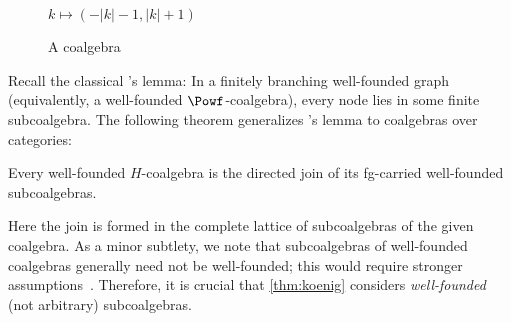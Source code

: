 \begin{figure}
\begin{minipage}[b]{.40\textwidth}
  \label{fig:joinSubcoalgebras}
  \end{minipage}  \begin{minipage}[b]{.30\textwidth}
  \caption{Cartesianess.}
  \label{fig:joinCartesian}
  \end{minipage}  \begin{minipage}[b]{.30\textwidth}
    \centering
    \\[2mm]
    $k \mapsto (-|k|{-}1, |k|{+}1)$
  \caption{A coalgebra}
  \label{fig:coalgExample}
  \end{minipage}\end{figure}

Recall the classical \Konig's lemma: In a finitely branching well-founded graph (equivalently, a well-founded $\Powf$-coalgebra), every node lies in some finite subcoalgebra. The following theorem generalizes \Konig's lemma to coalgebras over \lfp categories:

\begin{theorem}\label{thm:koenig}
Every well-founded $H$-coalgebra is the directed join of its fg-carried well-founded subcoalgebras.
\end{theorem}
Here the join is formed in the complete lattice of subcoalgebras of the given coalgebra. As a minor subtlety, we note that subcoalgebras of well-founded coalgebras generally need not be well-founded; this would require stronger assumptions~\cite[Prop.~8.4.7]{amm25}. Therefore, it is crucial that \autoref{thm:koenig} considers \emph{well-founded} (not arbitrary) subcoalgebras. 


